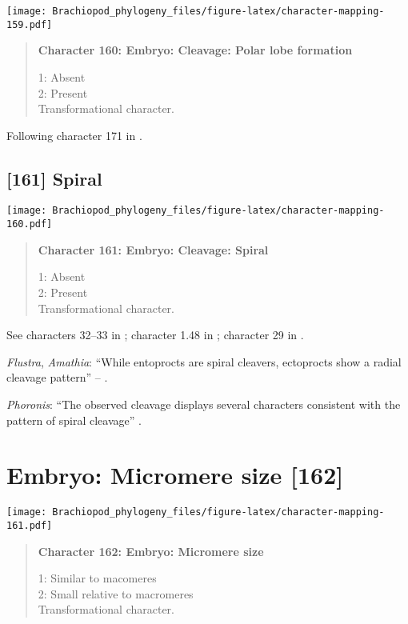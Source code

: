 \documentclass[openany]{book}
\theoremstyle{definition}
\theoremstyle{definition}
\theoremstyle{definition}
\theoremstyle{remark}
\begin{document}
\texttt{[image: Brachiopod\_phylogeny\_files/figure-latex/character-mapping-159.pdf]}

\begin{quote}
\textbf{Character 160: Embryo: Cleavage: Polar lobe formation}

1: Absent\\
2: Present\\
Transformational character.
\end{quote}

Following character 171 in \citet{Giribet2002}.

\subsection*{{[}161{]} Spiral}\label{spiral}

\texttt{[image: Brachiopod\_phylogeny\_files/figure-latex/character-mapping-160.pdf]}

\begin{quote}
\textbf{Character 161: Embryo: Cleavage: Spiral}

1: Absent\\
2: Present\\
Transformational character.
\end{quote}

See characters 32--33 in \citet{Haszprunar1996}; character 1.48 in
\citet{SPS1996}; character 29 in \citet{Glenner2004}.

\hypertarget{Amathia-coding-161}{}
\emph{Flustra}, \emph{Amathia}: ``While entoprocts are spiral cleavers,
ectoprocts show a radial cleavage pattern'' -- \citet{Fuchs2008}.

\hypertarget{Phoronis-coding-161}{}
\emph{Phoronis}: ``The observed cleavage displays several characters
consistent with the pattern of spiral cleavage''
\citep{Pennerstorfer2012}.

\section{Embryo: Micromere size
{[}162{]}}\label{embryo-micromere-size-162}

\texttt{[image: Brachiopod\_phylogeny\_files/figure-latex/character-mapping-161.pdf]}

\begin{quote}
\textbf{Character 162: Embryo: Micromere size}

1: Similar to macomeres\\
2: Small relative to macromeres\\
Transformational character.
\end{quote}
\end{document}
